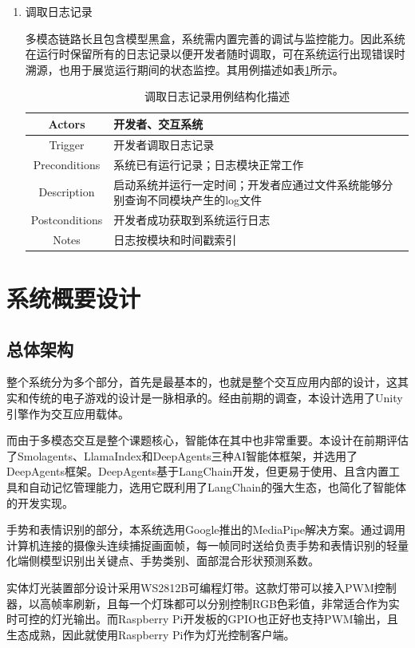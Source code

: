 \documentclass[bachelor]{njupthesis}
\begin{document}
\begin{enumerate}
\item 调取日志记录

多模态链路长且包含模型黑盒，系统需内置完善的调试与监控能力。因此系统在运行时保留所有的日志记录以便开发者随时调取，可在系统运行出现错误时溯源，也用于展览运行期间的状态监控。其用例描述如表\ref{tbl:usecase-log}所示。

\begin{table}[h]
\centering
\caption{调取日志记录用例结构化描述}
\begin{tabularx}{\linewidth}{cX}
\toprule
Actors & 开发者、交互系统 \\
\midrule
Trigger & 开发者调取日志记录 \\
Preconditions & 系统已有运行记录；日志模块正常工作 \\
Description & 启动系统并运行一定时间；开发者应通过文件系统能够分别查询不同模块产生的log文件 \\
Postconditions & 开发者成功获取到系统运行日志 \\
Notes & 日志按模块和时间戳索引 \\
\bottomrule
\end{tabularx}
\label{tbl:usecase-log}
\end{table}
\end{enumerate}

\section{系统概要设计}

\subsection{总体架构}

整个系统分为多个部分，首先是最基本的，也就是整个交互应用内部的设计，这其实和传统的电子游戏的设计是一脉相承的。经由前期的调查，本设计选用了Unity引擎作为交互应用载体。

而由于多模态交互是整个课题核心，智能体在其中也非常重要。本设计在前期评估了Smolagents、LlamaIndex和DeepAgents三种AI智能体框架，并选用了DeepAgents框架。DeepAgents基于LangChain开发，但更易于使用、且含内置工具和自动记忆管理能力，选用它既利用了LangChain的强大生态，也简化了智能体的开发实现。

手势和表情识别的部分，本系统选用Google推出的MediaPipe解决方案。通过调用计算机连接的摄像头连续捕捉画面帧，每一帧同时送给负责手势和表情识别的轻量化端侧模型识别出关键点、手势类别、面部混合形状预测系数。

实体灯光装置部分设计采用WS2812B可编程灯带。这款灯带可以接入PWM控制器，以高帧率刷新，且每一个灯珠都可以分别控制RGB色彩值，非常适合作为实时可控的灯光输出。而Raspberry Pi开发板的GPIO也正好也支持PWM输出，且生态成熟，因此就使用Raspberry Pi作为灯光控制客户端。
\end{document}
